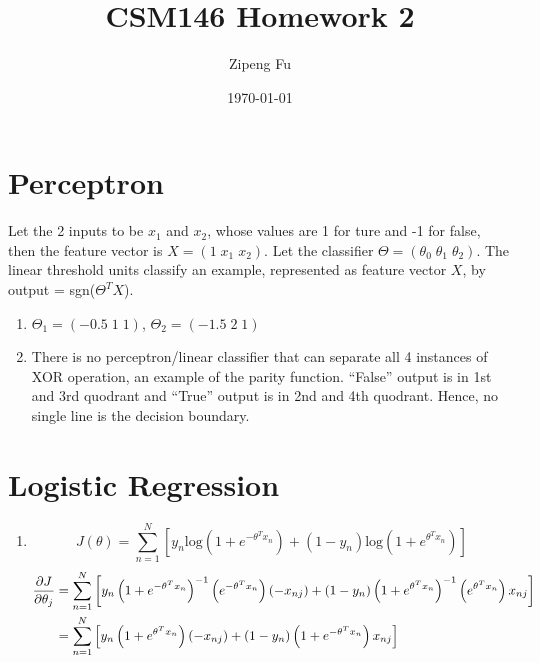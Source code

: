 \documentclass[11pt]{article}
\title{\textbf{CSM146 Homework 2}}
\author{Zipeng Fu}
\date{\today}
\begin{document}
\maketitle
\newpage 

\section{Perceptron}
    Let the 2 inputs to be $x_1$ and $x_2$, whose values are 1 for ture and -1 for false, then the feature vector is $X = (1\;x_1\;x_2)$. Let the classifier $\Theta = (\theta_0\;\theta_1\;\theta_2)$. The linear threshold units classify an example, represented as feature vector $X$, by output = sgn($\Theta^TX$).
\begin{enumerate}[label=(\alph*)]
\item
    $\Theta_1 = (-0.5\;1\;1)$, $\Theta_2 = (-1.5\;2\;1)$
\item
    There is no perceptron/linear classifier that can separate all 4 instances of XOR operation, an example of the parity function. ``False'' output is in 1st and 3rd quodrant and ``True'' output is in 2nd and 4th quodrant. Hence, no single line is the decision boundary.
\end{enumerate}


\section{Logistic Regression}
\begin{enumerate}[label=(\alph*)]
\item
    $$J(\theta) = \sum^N_{n=1}{\left[y_n\text{log}\left(1+e^{-\theta^Tx_n}\right)+(1-y_n)\text{log}\left(1+e^{\theta^Tx_n}\right)\right]}$$
    \begin{equation*}
    \begin{split}
        \pdv{J}{\theta_j}
        & = \sum^N_{n=1}{\left[y_n\left(1+e^{-\theta^Tx_n}\right)^{-1}\left(e^{-\theta^Tx_n}\right)(-x_{nj})+(1-y_n)\left(1+e^{\theta^Tx_n}\right)^{-1}\left(e^{\theta^Tx_n}\right)x_{nj}\right]}\\
        & = \sum^N_{n=1}{\left[y_n\left(1+e^{\theta^Tx_n}\right)(-x_{nj})+(1-y_n)\left(1+e^{-\theta^Tx_n}\right)x_{nj}\right]}
    \end{split}
    \end{equation*}
\end{enumerate}
\end{document}
